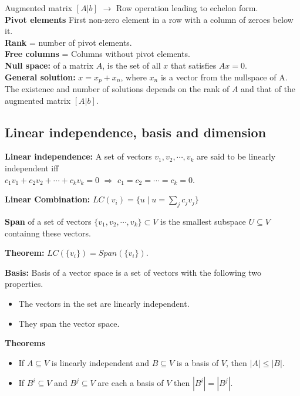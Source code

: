 Augmented matrix $[A|b]$ $\rightarrow$ Row operation leading to echelon form.\\
\textbf{Pivot elements} First non-zero element in a row with a column of zeroes below it.\\
\textbf{Rank} = number of pivot elements.\\
\textbf{Free columns} = Columns without pivot elements.\\
\textbf{Null space:} of a matrix $A$, is the set of all $x$ that satisfies $Ax = 0$.\\
\textbf{General solution:} $x = x_p + x_n$, where $x_n$ is a vector from the nullspace of A.\\
The existence and number of solutions depends on the rank of $A$ and that of the augmented matrix $[A|b]$.\\


\subsection{Linear independence, basis and dimension}

\textbf{Linear independence:} A set of vectors $v_1, v_2, \cdots, v_k$ are said to be linearly independent iff\\
$c_1v_1 + c_2v_2 + \cdots + c_kv_k = 0$ $\Rightarrow$ $c_1 = c_2 = \cdots = c_k = 0$.

\textbf{Linear Combination:} $LC(v_i) = \{u \mid u = \sum_j c_jv_j\}$


\textbf{Span} of a set of vectors $\{v_1, v_2, \cdots, v_k\} \subset V$ 
is the smallest subspace $U \subseteq V$ containng these vectors.

\begin{mdframed}[backgroundcolor=SlateGray2!40,linecolor=Firebrick4]
\textbf{Theorem:} $LC(\{v_i\}) = Span(\{v_i\})$.
\end{mdframed}

\textbf{Basis:} Basis of a vector space is a set of vectors with the following 
                two properties.\\
\begin{itemize}
	\item The vectors in the set are linearly independent.
	\item They span the vector space.
\end{itemize}

\begin{mdframed}[backgroundcolor=SlateGray2!40,linecolor=Firebrick4]
\textbf{Theorems}
\begin{itemize}
\item If $A \subseteq V$ is linearly independent and $B \subseteq V$ is a basis
        of $V$, then $|A| \leq |B|$.
\item If $B^i \subseteq V$ and $B^j \subseteq V$ are each a basis of $V$ then 
        $|B^i| = |B^j|$.
\end{itemize}
\end{mdframed}

